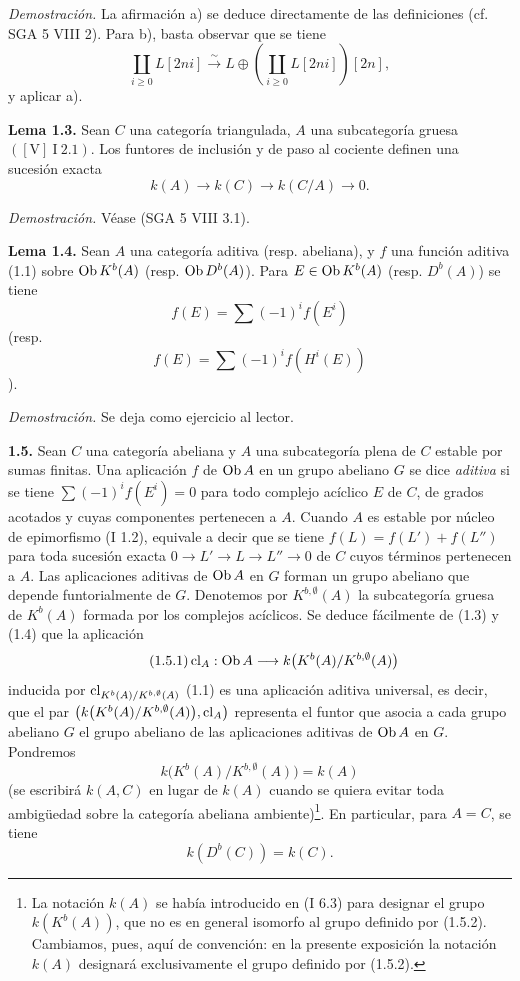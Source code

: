 \emph{Demostración.} La afirmación a) se deduce directamente de las definiciones (cf. SGA 5 VIII 2). Para b), basta observar que se tiene
\[
 \coprod_{i\geq0} L[2ni]\xrightarrow{\sim}
 L\oplus\left(\coprod_{i\geq0}L[2ni]\right)[2n],
\]
y aplicar a).

\textbf{Lema 1.3.} Sean \(C\) una categoría triangulada, \(A\) una subcategoría gruesa \(([\mathrm V]\ \mathrm I\ 2.1)\). Los funtores de inclusión y de paso al cociente definen una sucesión exacta
\[
 k(A)\longrightarrow k(C)\longrightarrow k(C/A)\longrightarrow 0.
\]

\emph{Demostración.} Véase (SGA 5 VIII 3.1).

\textbf{Lema 1.4.} Sean \(A\) una categoría aditiva (resp. abeliana), y \(f\) una función aditiva (1.1) sobre \(\operatorname{Ob} K^b(A)\) (resp. \(\operatorname{Ob} D^b(A)\)). Para \(E\in\operatorname{Ob} K^b(A)\) (resp. \(D^b(A)\)) se tiene
\[
 f(E)=\sum(-1)^i f(E^i)
\]
(resp.
\[
 f(E)=\sum(-1)^i f(H^i(E))
\]).

\emph{Demostración.} Se deja como ejercicio al lector.

\textbf{1.5.} Sean \(C\) una categoría abeliana y \(A\) una subcategoría plena de \(C\) estable por sumas finitas. Una aplicación \(f\) de \(\operatorname{Ob} A\) en un grupo abeliano \(G\) se dice \emph{aditiva} si se tiene \(\sum(-1)^i f(E^i)=0\) para todo complejo acíclico \(E\) de \(C\), de grados acotados y cuyas componentes pertenecen a \(A\). Cuando \(A\) es estable por núcleo de epimorfismo (I 1.2), equivale a decir que se tiene \(f(L)=f(L')+f(L'')\) para toda sucesión exacta \(0\longrightarrow L'\longrightarrow L\longrightarrow L''\longrightarrow0\) de \(C\) cuyos términos pertenecen a \(A\). Las aplicaciones aditivas de \(\operatorname{Ob} A\) en \(G\) forman un grupo abeliano que depende funtorialmente de \(G\). Denotemos por \(K^{b,\emptyset}(A)\) la subcategoría gruesa de \(K^b(A)\) formada por los complejos acíclicos. Se deduce fácilmente de (1.3) y (1.4) que la aplicación
\begin{equation}\tag{1.5.1}
 \operatorname{cl}_A:\operatorname{Ob} A\longrightarrow k\bigl(K^b(A)/K^{b,\emptyset}(A)\bigr)
\end{equation}
inducida por \(\operatorname{cl}_{K^b(A)/K^{b,\emptyset}(A)}\) (1.1) es una aplicación aditiva universal, es decir, que el par \(\left(k\bigl(K^b(A)/K^{b,\emptyset}(A)\bigr),\operatorname{cl}_A\right)\) representa el funtor que asocia a cada grupo abeliano \(G\) el grupo abeliano de las aplicaciones aditivas de \(\operatorname{Ob} A\) en \(G\). Pondremos
\begin{equation}\tag{1.5.2}
 k\bigl(K^b(A)/K^{b,\emptyset}(A)\bigr)=k(A)
\end{equation}
(se escribirá \(k(A,C)\) en lugar de \(k(A)\) cuando se quiera evitar toda ambigüedad sobre la categoría abeliana ambiente)\footnote{La notación \(k(A)\) se había introducido en (I 6.3) para designar el grupo \(k(K^b(A))\), que no es en general isomorfo al grupo definido por (1.5.2). Cambiamos, pues, aquí de convención: en la presente exposición la notación \(k(A)\) designará exclusivamente el grupo definido por (1.5.2).}.
En particular, para \(A=C\), se tiene
\begin{equation}\tag{1.5.3}
 k(D^b(C))=k(C).
\end{equation}

